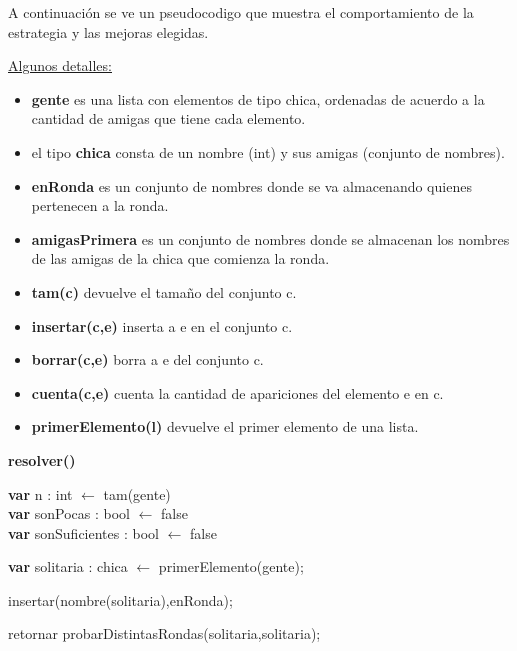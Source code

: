 A continuación se ve un pseudocodigo que muestra el comportamiento de la estrategia y las mejoras elegidas.

\vspace{3cm}
\underline{Algunos detalles:}

\begin{itemize}
 \item \textbf{gente} es una lista con elementos de tipo chica, ordenadas de acuerdo a la cantidad de amigas que tiene cada elemento.
 \item el tipo \textbf{chica} consta de un nombre (int) y sus amigas (conjunto de nombres).
 \item \textbf{enRonda} es un conjunto de nombres donde se va almacenando quienes pertenecen a la ronda.
 \item \textbf{amigasPrimera} es un conjunto de nombres donde se almacenan los nombres de las amigas de la chica que comienza la ronda.
 \item \textbf{tam(c)} devuelve el tamaño del conjunto c.
 \item \textbf{insertar(c,e)} inserta a e en el conjunto c.
 \item \textbf{borrar(c,e)} borra a e del conjunto c.
 \item \textbf{cuenta(c,e)} cuenta la cantidad de apariciones del elemento e en c.
 \item \textbf{primerElemento(l)} devuelve el primer elemento de una lista.
\end{itemize}

\newpage

\incmargin{1em}
\linesnumbered
{}

\textbf{resolver()}\\
	\begin{algorithm}[H]
		\BlankLine
		\textbf{var} n : int $\leftarrow$ tam(gente) \\
		\textbf{var} sonPocas : bool $\leftarrow$ false \\
		\textbf{var} sonSuficientes : bool $\leftarrow$ false \\
		

	\textbf{var} solitaria : chica $\leftarrow$ primerElemento(gente);

	insertar(nombre(solitaria),enRonda);

	retornar  probarDistintasRondas(solitaria,solitaria);
	\BlankLine




	  \end{algorithm}
	  


